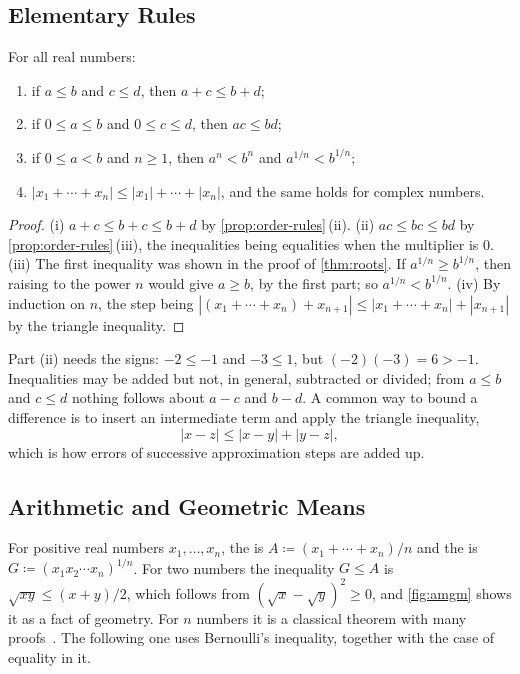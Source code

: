 \subsection{Elementary Rules}

\begin{proposition}
\label{prop:ineq-rules}
For all real numbers:
\begin{enumerate}
\item if $a\le b$ and $c\le d$, then $a+c\le b+d$;
\item if $0\le a\le b$ and $0\le c\le d$, then $ac\le bd$;
\item if $0\le a<b$ and $n\ge1$, then $a^n<b^n$ and $a^{1/n}<b^{1/n}$;
\item $|x_1+\cdots+x_n|\le|x_1|+\cdots+|x_n|$, and the same holds for complex numbers.
\end{enumerate}
\end{proposition}

\begin{proof}
(i) $a+c\le b+c\le b+d$ by \cref{prop:order-rules}\,(ii). (ii) $ac\le bc\le bd$ by \cref{prop:order-rules}\,(iii), the inequalities being equalities when the multiplier is $0$. (iii) The first inequality was shown in the proof of \cref{thm:roots}. If $a^{1/n}\ge b^{1/n}$, then raising to the power $n$ would give $a\ge b$, by the first part; so $a^{1/n}<b^{1/n}$. (iv) By induction on $n$, the step being $|(x_1+\cdots+x_n)+x_{n+1}|\le|x_1+\cdots+x_n|+|x_{n+1}|$ by the triangle inequality.
\end{proof}

Part (ii) needs the signs: $-2\le-1$ and $-3\le1$, but $(-2)(-3)=6>-1$. Inequalities may be added but not, in general, subtracted or divided; from $a\le b$ and $c\le d$ nothing follows about $a-c$ and $b-d$. A common way to bound a difference is to insert an intermediate term and apply the triangle inequality,
\[
|x-z|\le|x-y|+|y-z| ,
\]
which is how errors of successive approximation steps are added up.

\subsection{Arithmetic and Geometric Means}

For positive real numbers $x_1,\ldots,x_n$, the  is $A\coloneqq(x_1+\cdots+x_n)/n$ and the  is $G\coloneqq(x_1x_2\cdots x_n)^{1/n}$. For two numbers the inequality $G\le A$ is $\sqrt{xy}\le(x+y)/2$, which follows from $(\sqrt x-\sqrt y)^2\ge0$, and \cref{fig:amgm} shows it as a fact of geometry. For $n$ numbers it is a classical theorem with many proofs~\cite{hardy1952inequalities,steele2004}. The following one uses Bernoulli's inequality, together with the case of equality in it.

